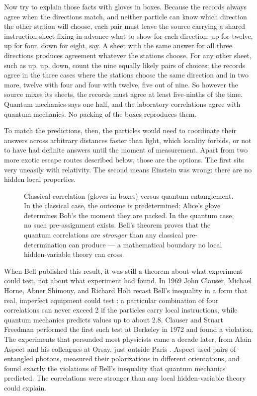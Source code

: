 Now try to explain those facts with gloves in boxes. Because the records always agree when the directions match, and neither particle can know which direction the other station will choose, each pair must leave the source carrying a shared instruction sheet fixing in advance what to show for each direction: up for twelve, up for four, down for eight, say. A sheet with the same answer for all three directions produces agreement whatever the stations choose. For any other sheet, such as up, up, down, count the nine equally likely pairs of choices: the records agree in the three cases where the stations choose the same direction and in two more, twelve with four and four with twelve, five out of nine. So however the source mixes its sheets, the records must agree at least five-ninths of the time. Quantum mechanics says one half, and the laboratory correlations agree with quantum mechanics. No packing of the boxes reproduces them.

To match the predictions, then, the particles would need to coordinate their answers across arbitrary distances faster than light, which locality forbids, or not to have had definite answers until the moment of measurement. Apart from two more exotic escape routes described below, those are the options. The first sits very uneasily with relativity. The second means Einstein was wrong: there are no hidden local properties.

\begin{figure}[htbp]
  \centering
  \resizebox{\linewidth}{!}{}
  \caption[Classical correlation vs.\ quantum entanglement]{Classical correlation (gloves in boxes) versus quantum entanglement. In the classical case, the outcome is predetermined: Alice's glove determines Bob's the moment they are packed. In the quantum case, no such pre-assignment exists. Bell's theorem proves that the quantum correlations are \emph{stronger} than any classical pre-determination can produce --- a mathematical boundary no local hidden-variable theory can cross.}
  \label{fig:bell-gloves}
\end{figure}

When Bell published this result, it was still a theorem about what experiment could test, not about what experiment had found. In 1969 John Clauser, Michael Horne, Abner Shimony, and Richard Holt recast Bell's inequality in a form that real, imperfect equipment could test \citep{CHSH1969}: a particular combination of four correlations can never exceed 2 if the particles carry local instructions, while quantum mechanics predicts values up to about 2.8. Clauser and Stuart Freedman performed the first such test at Berkeley in 1972 and found a violation. The experiments that persuaded most physicists came a decade later, from Alain Aspect and his colleagues at Orsay, just outside Paris \citep{Aspect1982}. Aspect used pairs of entangled photons, measured their polarizations in different orientations, and found exactly the violations of Bell's inequality that quantum mechanics predicted. The correlations were stronger than any local hidden-variable theory could explain.

